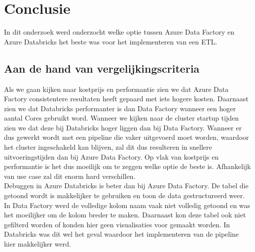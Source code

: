 
\chapter{Conclusie}%
\label{ch:conclusie}


In dit onderzoek werd onderzocht welke optie tussen Azure Data Factory en Azure Databricks het beste was voor het implementeren van een ETL.

\section{Aan de hand van vergelijkingscriteria}


Als we gaan kijken naar kostprijs en performantie zien we dat Azure Data Factory consistentere resultaten heeft gepaard met iets hogere kosten. Daarnaast zien we dat Databricks performanter is dan Data Factory wanneer een hoger aantal Cores gebruikt word. Wanneer we kijken naar de cluster startup tijden zien we dat deze bij Databricks hoger liggen dan bij Data Factory. Wanneer er dus gewerkt wordt met een pipeline die vaker uitgevoerd moet worden, waardoor het cluster ingeschakeld kan blijven, zal dit dus resulteren in snellere uitvoeringstijden dan bij Azure Data Factory. Op vlak van kostprijs en performantie is het dus moeilijk om te zeggen welke optie de beste is. Afhankelijk van use case zal dit enorm hard verschillen.\\



Debuggen in Azure Databricks is beter dan bij Azure Data Factory. De tabel die getoond wordt is makkelijker te gebruiken en toon de data gestructureerd weer. In Data Factory werd de volledige kolom naam vaak niet volledig getoond en was het moeilijker om de kolom breder te maken. Daarnaast kon deze tabel ook niet gefilterd worden of konden hier geen visualisaties voor gemaakt worden. In Databricks was dit wel het geval waardoor het implementeren van de pipeline hier makkelijker werd.\\

